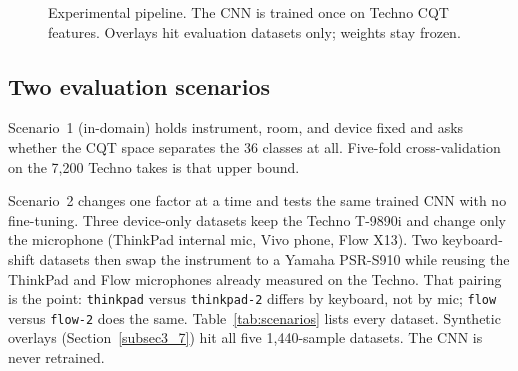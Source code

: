 \documentclass[pdflatex,sn-mathphys-num,iicol]{sn-jnl}
\theoremstyle{thmstyleone}
\theoremstyle{thmstyletwo}
\theoremstyle{thmstylethree}
\begin{document}
\begin{figure}[t]
{%
  }
  \caption{Experimental pipeline. The CNN is trained once on Techno CQT features. Overlays hit evaluation datasets only; weights stay frozen.}
  \label{fig:methodology}
\end{figure}

\subsection{Two evaluation scenarios}\label{subsec3_0}

Scenario~1 (in-domain) holds instrument, room, and device fixed and asks whether the CQT space separates the 36 classes at all. Five-fold cross-validation on the 7{,}200 Techno takes is that upper bound.

Scenario~2 changes one factor at a time and tests the same trained CNN with no fine-tuning. Three device-only datasets keep the Techno T-9890i and change only the microphone (ThinkPad internal mic, Vivo phone, Flow X13). Two keyboard-shift datasets then swap the instrument to a Yamaha PSR-S910 while reusing the ThinkPad and Flow microphones already measured on the Techno. That pairing is the point: \texttt{thinkpad} versus \texttt{thinkpad-2} differs by keyboard, not by mic; \texttt{flow} versus \texttt{flow-2} does the same. Table~\ref{tab:scenarios} lists every dataset. Synthetic overlays (Section~\ref{subsec3_7}) hit all five 1{,}440-sample datasets. The CNN is never retrained.
\end{document}
